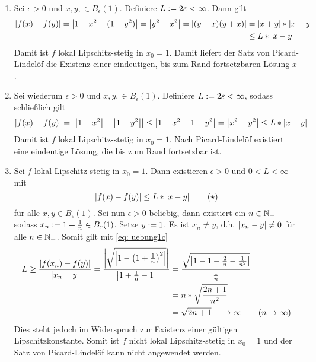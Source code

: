\begin{exercisePage}
\begin{enumerate}[label=(zu \alph*), leftmargin=*]
	\item Sei $\epsilon > 0$ und $x,y, \in B_\epsilon(1)$. Definiere $L \mathrel{:=} 2\varepsilon < \infty$. Dann gilt
	\begin{equation*}
		\begin{aligned}
			\left| f(x) - f(y) \right| 
			= \left| 1-x^2 - (1-y^2) \right| 
			= \left| y^2 - x^2 \right| 
			= \left| (y-x)(y+x) \right| 
			&= \left| x+y \right| * \left| x-y \right| \\
			&\le L * \left| x-y \right|
		\end{aligned}
	\end{equation*}
	Damit ist $f$ lokal Lipschitz-stetig in $x_0 = 1$. Damit liefert der Satz von Picard-Lindelöf die Existenz einer eindeutigen, bis zum Rand fortsetzbaren Lösung $x$.
	\item Sei wiederum $\epsilon > 0$ und $x,y, \in B_\epsilon(1)$. Definiere $L \mathrel{:=} 2\varepsilon < \infty$, sodass schließlich gilt
	\begin{equation*}
		\begin{aligned}
			\left| f(x) - f(y) \right| = \left| \left| 1-x^2 \right| - \left| 1-y^2 \right| \right| \le \left| 1 + x^2 - 1 - y^2 \right| = \left| x^2 - y^2 \right| \le L * \left| x-y \right|
		\end{aligned}
	\end{equation*}
	Damit ist $f$ lokal Lipschitz-stetig in $x_0 = 1$. Nach Picard-Lindelöf existiert eine eindeutige Lösung, die bis zum Rand fortsetzbar ist.
	\item Sei $f$ lokal Lipschitz-stetig in $x_0 = 1$. Dann existieren $\epsilon > 0$ und $0 < L < \infty$ mit
	\begin{equation*}
		\left| f(x) - f(y) \right| \le L * \left| x-y \right| 
		\tag{$\star$} \label{eq: uebung1c}
	\end{equation*}
	für alle $x,y \in B_\epsilon(1)$.
	Sei nun $\epsilon > 0$ beliebig, dann existiert ein $n \in \mathbb{N}_+$ sodass $x_n \mathrel{:=} 1 + \frac{1}{n} \in B_\varepsilon(1)$. Setze $y \mathrel{:=} 1$. Es ist $x_n \neq y$, d.h. $\left| x_n - y \right| \neq 0$ für alle $n \in \mathbb{N}_+$. Somit gilt mit \eqref{eq: uebung1c} 
	\begin{equation*}
		\begin{aligned}
			L \ge \frac{\left| f(x_n) - f(y) \right|}{\left| x_n - y \right|}
			= \frac{\left| \sqrt{\left| 1 - \left( 1+\frac{1}{n} \right)^2 \right|} \right|}{\left| 1 + \frac{1}{n} - 1 \right|}
			&= \frac{\sqrt{\left| 1 - 1 - \frac{2}{n} - \frac{1}{n^2} \right|}}{\frac{1}{n}} \\
			&= n * \sqrt{\frac{2n + 1}{n^2}} \\
			&= \sqrt{2n + 1} \enskip \longrightarrow \infty \qquad (n \to \infty)
		\end{aligned}
	\end{equation*}
	Dies steht jedoch im Widerspruch zur Existenz einer gültigen Lipschitzkonstante. Somit ist $f$ nicht lokal Lipschitz-stetig in $x_0 = 1$ und der Satz von Picard-Lindelöf kann nicht angewendet werden.
\end{enumerate}





\end{exercisePage}
